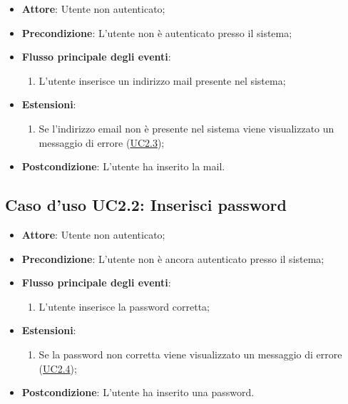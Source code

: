 \documentclass[12pt,a4paper]{article}
\begin{document}
\begin{itemize}

\item \textbf{Attore}: Utente non autenticato; 
\item \textbf{Precondizione}: L'utente non è autenticato presso il sistema;

\item \textbf{Flusso principale degli eventi}:
\begin{enumerate}
	\item L'utente inserisce un indirizzo mail presente nel sistema;
	
\end{enumerate}
\item \textbf{Estensioni}:
\begin{enumerate}
	\item Se l'indirizzo email non è presente nel sistema viene visualizzato un messaggio di errore (\hyperlink{UC2.3}{UC2.3});
	
\end{enumerate}
\item \textbf{Postcondizione}: L'utente ha inserito la mail.
\end{itemize}
\hypertarget{UC2.2}{}
\subsection{Caso d'uso UC2.2: Inserisci password}

\begin{itemize}

\item \textbf{Attore}: Utente non autenticato; 
\item \textbf{Precondizione}: L’utente non è ancora autenticato presso il sistema;

\item \textbf{Flusso principale degli eventi}:
\begin{enumerate}
	\item L'utente inserisce la password corretta;
	
\end{enumerate}
\item \textbf{Estensioni}:
\begin{enumerate}
	\item Se la password non corretta viene visualizzato un messaggio di errore (\hyperlink{UC2.4}{UC2.4});
	
\end{enumerate}
\item \textbf{Postcondizione}: L'utente ha inserito una password.
\end{itemize}
\hypertarget{UC2.3}{}
\end{document}
